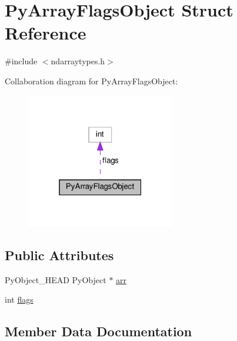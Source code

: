 \hypertarget{structPyArrayFlagsObject}{}\section{Py\+Array\+Flags\+Object Struct Reference}
\label{structPyArrayFlagsObject}


{\ttfamily \#include $<$ndarraytypes.\+h$>$}



Collaboration diagram for Py\+Array\+Flags\+Object\+:
\nopagebreak
\begin{figure}[H]
\begin{center}
\leavevmode
\includegraphics[width=184pt]{structPyArrayFlagsObject__coll__graph}
\end{center}
\end{figure}
\subsection*{Public Attributes}
\begin{DoxyCompactItemize}
\item 
Py\+Object\+\_\+\+H\+E\+AD Py\+Object $\ast$ \hyperlink{structPyArrayFlagsObject_ae4daece864e6c37708b075bbc978fa16}{arr}
\item 
int \hyperlink{structPyArrayFlagsObject_ab7f33743a6d4dd8d4918d92c0ea3e84d}{flags}
\end{DoxyCompactItemize}


\subsection{Member Data Documentation}
\mbox{\label{structPyArrayFlagsObject_ae4daece864e6c37708b075bbc978fa16}} 
